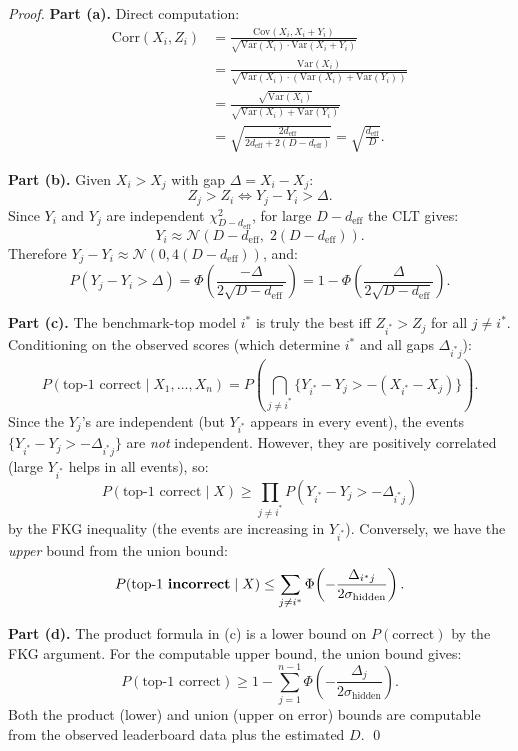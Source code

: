 \begin{proof}
\textbf{Part (a).} Direct computation:
\begin{align*}
  \mathrm{Corr}(X_i, Z_i) &= \frac{\mathrm{Cov}(X_i, X_i + Y_i)}{\sqrt{\mathrm{Var}(X_i) \cdot \mathrm{Var}(X_i + Y_i)}} \\
  &= \frac{\mathrm{Var}(X_i)}{\sqrt{\mathrm{Var}(X_i) \cdot (\mathrm{Var}(X_i) + \mathrm{Var}(Y_i))}} \\
  &= \frac{\sqrt{\mathrm{Var}(X_i)}}{\sqrt{\mathrm{Var}(X_i) + \mathrm{Var}(Y_i)}} \\
  &= \sqrt{\frac{2 d_{\mathrm{eff}}}{2 d_{\mathrm{eff}} + 2(D - d_{\mathrm{eff}})}} = \sqrt{\frac{d_{\mathrm{eff}}}{D}}.
\end{align*}

\textbf{Part (b).} Given $X_i > X_j$ with gap $\Delta = X_i - X_j$:
\[
  Z_j > Z_i \iff Y_j - Y_i > \Delta.
\]
Since $Y_i$ and $Y_j$ are independent $\chi^2_{D - d_{\mathrm{eff}}}$, for large $D - d_{\mathrm{eff}}$ the CLT gives:
\[
  Y_i \approx \mathcal{N}(D - d_{\mathrm{eff}},\; 2(D - d_{\mathrm{eff}})).
\]
Therefore $Y_j - Y_i \approx \mathcal{N}(0, 4(D - d_{\mathrm{eff}}))$, and:
\[
  P(Y_j - Y_i > \Delta) = \Phi\!\left(\frac{-\Delta}{2\sqrt{D - d_{\mathrm{eff}}}}\right) = 1 - \Phi\!\left(\frac{\Delta}{2\sqrt{D - d_{\mathrm{eff}}}}\right).
\]

\textbf{Part (c).} The benchmark-top model $i^*$ is truly the best iff $Z_{i^*} > Z_j$ for all $j \neq i^*$. Conditioning on the observed scores (which determine $i^*$ and all gaps $\Delta_{i^* j}$):
\[
  P(\text{top-1 correct} \mid X_1, \ldots, X_n) = P\!\left(\bigcap_{j \neq i^*} \{Y_{i^*} - Y_j > -(X_{i^*} - X_j)\}\right).
\]
Since the $Y_j$'s are independent (but $Y_{i^*}$ appears in every event), the events $\{Y_{i^*} - Y_j > -\Delta_{i^*j}\}$ are \emph{not} independent. However, they are positively correlated (large $Y_{i^*}$ helps in all events), so:
\[
  P(\text{top-1 correct} \mid X) \geq \prod_{j \neq i^*} P(Y_{i^*} - Y_j > -\Delta_{i^*j})
\]
by the FKG inequality (the events are increasing in $Y_{i^*}$). Conversely, we have the \emph{upper} bound from the union bound:
\[
  P(\text{top-1 \textbf{incorrect}} \mid X) \leq \sum_{j \neq i^*} \Phi\!\left(-\frac{\Delta_{i^*j}}{2\sigma_{\mathrm{hidden}}}\right).
\]

\textbf{Part (d).} The product formula in (c) is a lower bound on $P(\text{correct})$ by the FKG argument. For the computable upper bound, the union bound gives:
\[
  P(\text{top-1 correct}) \geq 1 - \sum_{j=1}^{n-1} \Phi\!\left(-\frac{\Delta_j}{2\sigma_{\mathrm{hidden}}}\right).
\]
Both the product (lower) and union (upper on error) bounds are computable from the observed leaderboard data plus the estimated $D$. \qed
\end{proof}

